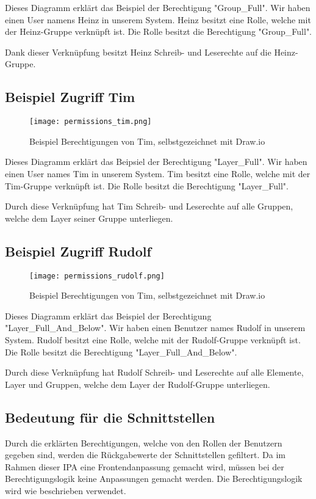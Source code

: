 Dieses Diagramm erklärt das Beispiel der Berechtigung "Group\_Full". Wir haben einen User namens Heinz
in unserem System. Heinz besitzt eine Rolle, welche mit der Heinz-Gruppe verknüpft ist. Die Rolle besitzt die Berechtigung "Group\_Full".

Dank dieser Verknüpfung besitzt Heinz Schreib- und Leserechte auf die Heinz-Gruppe.

\newpage

\subsection{Beispiel Zugriff Tim}
\begin{figure}[h]
  \centering
  \texttt{[image: permissions\_tim.png]}
  \caption{Beispiel Berechtigungen von Tim, selbstgezeichnet mit Draw.io}
\end{figure}

Dieses Diagramm erklärt das Beipsiel der Berechtigung "Layer\_Full".  Wir haben einen User names Tim in unserem System.
Tim besitzt eine Rolle, welche mit der Tim-Gruppe verknüpft ist. Die Rolle besitzt die Berechtigung "Layer\_Full".

Durch diese Verknüpfung hat Tim Schreib- und Leserechte auf alle Gruppen, welche dem Layer seiner Gruppe unterliegen. 

\newpage

\subsection{Beispiel Zugriff Rudolf}
\begin{figure}[h]
  \centering
  \texttt{[image: permissions\_rudolf.png]}
  \caption{Beispiel Berechtigungen von Tim, selbstgezeichnet mit Draw.io}
\end{figure}

Dieses Diagramm erklärt das Beispiel der Berechtigung "Layer\_Full\_And\_Below".  Wir haben einen Benutzer names Rudolf in unserem System.
Rudolf besitzt eine Rolle, welche mit der Rudolf-Gruppe verknüpft ist. Die Rolle besitzt die Berechtigung "Layer\_Full\_And\_Below".

Durch diese Verknüpfung hat Rudolf Schreib- und Leserechte auf alle Elemente, Layer und Gruppen, welche dem Layer der Rudolf-Gruppe unterliegen.

\subsection{Bedeutung für die Schnittstellen}
Durch die erklärten Berechtigungen, welche von den Rollen der Benutzern gegeben sind, werden die Rückgabewerte der Schnittstellen gefiltert.
Da im Rahmen dieser IPA eine Frontendanpassung gemacht wird, müssen bei der Berechtigungslogik keine Anpassungen gemacht werden. Die Berechtigungslogik wird
wie beschrieben verwendet.

